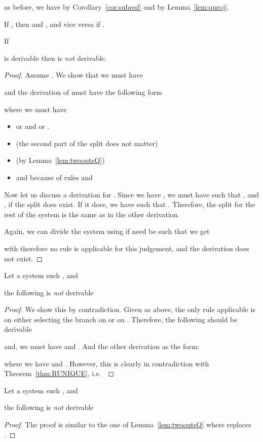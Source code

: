 as before, we have  by Corollary~\ref{cor:subred} and
 by Lemma~\ref{lem:qproj}.

If , then  and ,
and vice versa if  .


\begin{lemma}\label{lem:qbranch}

  If 
  
  is derivable then
   is \emph{not} derivable.
\end{lemma}

\begin{proof}
  Assume .
  We show that we must have
  
  and the derivation of  must have the following form
  
where we must have
\begin{itemize}
\item  or  and
   or .
\item  (the second part of the split does not matter)
\item  (by Lemma~\ref{lem:twooutsQ})
\item  and 
  because of rules  and 
\end{itemize}

Now let us discuss a derivation for .
Since we have  , we must have
 such that ,
and ,
if the split does exist.
If it does, we have
 such that . Therefore, the
split for the rest of the system is the same as in the other derivation.

Again, we can divide the system using  if need be such that we get

with  therefore no rule is applicable for
this judgement, and the derivation does not exist.

\end{proof}



\begin{lemma}\label{lem:twoouts}
  Let  a system such , and
  
  the following is \emph{not} derivable
  
\end{lemma}
\begin{proof}
  We show this by contradiction.
  Given  as above, the only rule applicable is  on 
  either selecting the branch on  or on .
  Therefore, the following should be derivable
  
and, we must have  and
.
And the other derivation as the form:

where we have  and
.
However, this is clearly in contradiction with Theorem~\ref{thm:RUNIQUE}, i.e.\

\end{proof}

\begin{lemma}\label{lem:twooutsQ}
  Let  a system such , and
  
  the following is \emph{not} derivable
  
\end{lemma}
\begin{proof}
  The proof is similar to the one of Lemma~\ref{lem:twooutsQ}
  where  replaces  
  .
\end{proof}

%